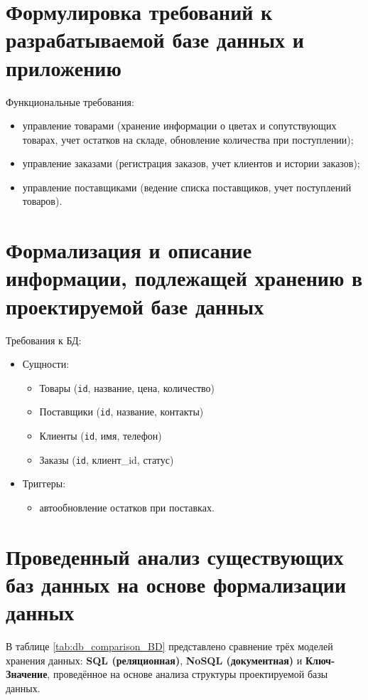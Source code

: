 \section{Формулировка требований к разрабатываемой базе данных и приложению}
Функциональные требования:
\begin{itemize}
	\item управление товарами (хранение информации о цветах и сопутствующих товарах, учет остатков на складе, обновление количества при поступлении);
	\item управление заказами (регистрация заказов, учет клиентов и истории заказов);
	\item управление поставщиками (ведение списка поставщиков, учет поступлений товаров).
\end{itemize}

\section{Формализация и описание информации, подлежащей хранению в проектируемой базе данных}
Требования к БД:
\begin{itemize}
	\item Сущности:
	\begin{itemize}
		\item Товары (\texttt{id}, название, цена, количество)
		\item Поставщики (\texttt{id}, название, контакты)
		\item Клиенты (\texttt{id}, имя, телефон)
		\item Заказы (\texttt{id}, клиент\_id, статус)
	\end{itemize}
	
	\item Триггеры:
	\begin{itemize}
		\item автообновление остатков при поставках.
	\end{itemize}
\end{itemize}

\section{Проведенный анализ существующих баз данных на основе формализации данных}
В таблице \ref{tab:db_comparison_BD} представлено сравнение трёх моделей хранения данных: \textbf{SQL (реляционная)}, \textbf{NoSQL (документная)} и \textbf{Ключ-Значение}, проведённое на основе анализа структуры проектируемой базы данных.
\clearpage

